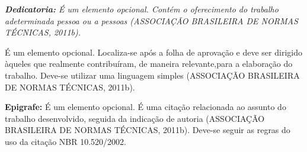 \documentclass[
  12pt,				    %
  openright,			%
  oneside,			  %
  a4paper,			  %
  chapter=TITLE,  %
  section=TITLE,  %
  english,			  %
  french,				  %
  spanish,			  %
  brazil				  %
]{iftex}
\begin{document}
  
  \graphicspath{{figuras/}}


  \pretextual

  \imprimircapa
  \imprimirfolhaderosto
  \imprimirfichacatalografica
   


  \imprimiraprovacao

  \begin{dedicatoria}
    \vspace*{\fill}
    \noindent

    \begin{flushright}
      \textit{
        \textbf{Dedicatoria:} É um elemento opcional. Contém o oferecimento do trabalho adeterminada pessoa ou a pessoas (ASSOCIAÇÃO BRASILEIRA DE NORMAS TÉCNICAS, 2011b).} 
    \end{flushright}

    \vspace*{2.0cm}
	\end{dedicatoria}
    
  \begin{agradecimentos}
    É um elemento opcional. Localiza-se após a folha de aprovação e deve ser dirigido àqueles que realmente contribuíram, de maneira relevante,para a elaboração do trabalho. Deve-se utilizar uma linguagem simples (ASSOCIAÇÃO BRASILEIRA DE NORMAS TÉCNICAS, 2011b).
  \end{agradecimentos}
  
  \begin{epigrafe}
    \vspace*{\fill}
    \begin{center}
      \textbf{Epigrafe:} É um elemento opcional. É uma citação relacionada ao assunto do trabalho desenvolvido, seguida da indicação de autoria (ASSOCIAÇÃO BRASILEIRA DE NORMAS TÉCNICAS, 2011b).   Deve-se seguir as regras do uso da citação NBR 10.520/2002. 
    \end{center}
  \end{epigrafe}
  
\end{document}
